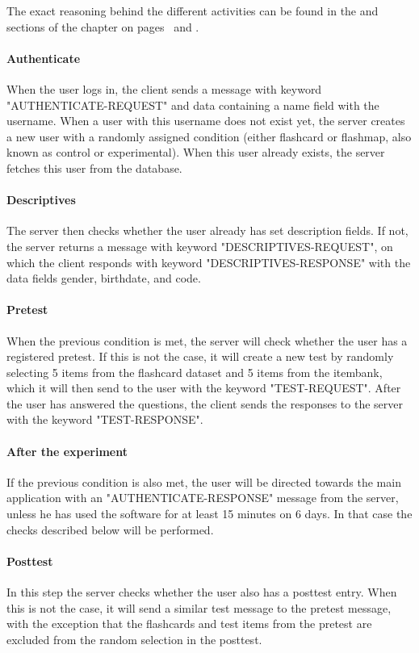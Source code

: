 The exact reasoning behind the different activities can be found in the  and  sections of the  chapter on pages~\pageref{sec:procedure} and \pageref{sec:instrumentation}.

\paragraph{Authenticate} When the user logs in, the client sends a message with keyword "AUTHENTICATE-REQUEST" and data containing a name field with the username. When a user with this username does not exist yet, the server creates a new user with a randomly assigned condition (either flashcard or flashmap, also known as control or experimental). When this user already exists, the server fetches this user from the database.

\paragraph{Descriptives} The server then checks whether the user already has set description fields. If not, the server returns a message with keyword "DESCRIPTIVES-REQUEST", on which the client responds with keyword "DESCRIPTIVES-RESPONSE" with the data fields gender, birthdate, and code.

\paragraph{Pretest} When the previous condition is met, the server will check whether the user has a registered pretest. If this is not the case, it will create a new test by randomly selecting 5 items from the flashcard dataset and 5 items from the itembank, which it will then send to the user with the keyword "TEST-REQUEST". After the user has answered the questions, the client sends the responses to the server with the keyword "TEST-RESPONSE".

\paragraph{After the experiment} If the previous condition is also met, the user will be directed towards the main application with an "AUTHENTICATE-RESPONSE" message from the server, unless he has used the software for at least 15 minutes on 6 days. In that case the checks described below will be performed.

\paragraph{Posttest} In this step the server checks whether the user also has a posttest entry. When this is not the case, it will send a similar test message to the pretest message, with the exception that the flashcards and test items from the pretest are excluded from the random selection in the posttest.

